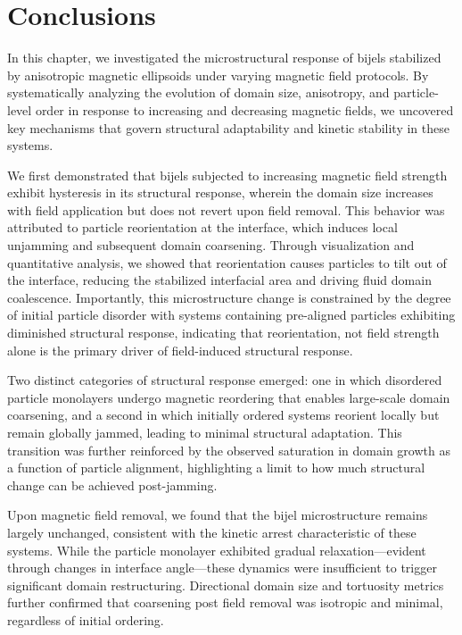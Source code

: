 \section{Conclusions}

In this chapter, we investigated the microstructural response of bijels stabilized by anisotropic magnetic ellipsoids under varying magnetic field protocols. 
By systematically analyzing the evolution of domain size, anisotropy, and particle-level order in response to increasing and decreasing magnetic fields, 
we uncovered key mechanisms that govern structural adaptability and kinetic stability in these systems.

We first demonstrated that bijels subjected to increasing magnetic field strength exhibit hysteresis in its structural response, wherein the domain size increases 
with field application but does not revert upon field removal. This behavior was attributed to particle reorientation at the interface, which induces local 
unjamming and subsequent domain coarsening. Through visualization and quantitative analysis, we showed that reorientation causes particles to tilt out of the 
interface, reducing the stabilized interfacial area and driving fluid domain coalescence. Importantly, this microstructure change is constrained by the degree 
of initial particle disorder with systems containing pre-aligned particles exhibiting diminished structural response, indicating that reorientation, not field strength 
alone is the primary driver of field-induced structural response.

Two distinct categories of structural response emerged: one in which disordered particle monolayers undergo magnetic reordering that enables large-scale domain 
coarsening, and a second in which initially ordered systems reorient locally but remain globally jammed, leading to minimal structural adaptation. This transition 
was further reinforced by the observed saturation in domain growth as a function of particle alignment, highlighting a limit to how much structural change can be 
achieved post-jamming.

Upon magnetic field removal, we found that the bijel microstructure remains largely unchanged, consistent with the kinetic arrest characteristic of these systems. 
While the particle monolayer exhibited gradual relaxation—evident through changes in interface angle—these dynamics were insufficient to trigger significant domain 
restructuring. Directional domain size and tortuosity metrics further confirmed that coarsening post field removal was isotropic and minimal, regardless of initial 
ordering.

